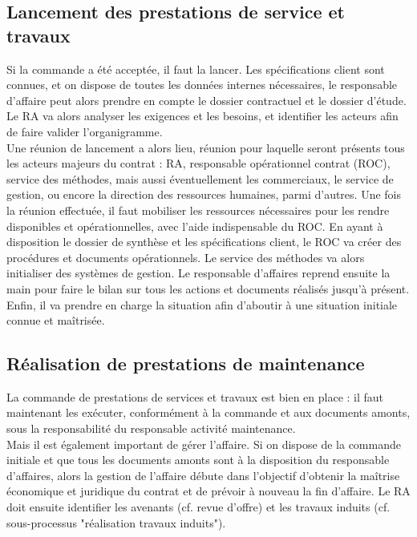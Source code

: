 \subsection{Lancement des prestations de service et travaux}

Si la commande a été acceptée, il faut la lancer. Les spécifications client sont connues, et on dispose de toutes les données internes nécessaires, le responsable d'affaire peut alors prendre en compte le dossier contractuel et le dossier d'étude. Le RA va alors analyser les exigences et les besoins, et identifier les acteurs afin de faire valider l'organigramme. \\

Une réunion de lancement a alors lieu, réunion pour laquelle seront présents tous les acteurs majeurs du contrat : RA, responsable opérationnel contrat (ROC), service des méthodes, mais aussi éventuellement les commerciaux, le service de gestion, ou encore la direction des ressources humaines, parmi d'autres. Une fois la réunion effectuée, il faut mobiliser les ressources nécessaires pour les rendre disponibles et opérationnelles, avec l'aide indispensable du ROC. En ayant à disposition le dossier de synthèse et les spécifications client, le ROC va créer des procédures et documents opérationnels. Le service des méthodes va alors initialiser des systèmes de gestion. Le responsable d'affaires reprend ensuite la main pour faire le bilan sur tous les actions et documents réalisés jusqu'à présent. Enfin, il va prendre en charge la situation afin d'aboutir à une situation initiale connue et maîtrisée.

\subsection{Réalisation de prestations de maintenance}

La commande de prestations de services et travaux est bien en place : il faut maintenant les exécuter, conformément à la commande et aux documents amonts, sous la responsabilité du responsable activité maintenance. \\

Mais il est également important de gérer l'affaire. Si on dispose de la commande initiale et que tous les documents amonts sont à la disposition du responsable d'affaires, alors la gestion de l'affaire débute dans l'objectif d'obtenir la maîtrise économique et juridique du contrat et de prévoir à nouveau la fin d'affaire. Le RA doit ensuite identifier les avenants (cf. revue d'offre) et les travaux induits (cf. sous-processus "réalisation travaux induits"). \\

